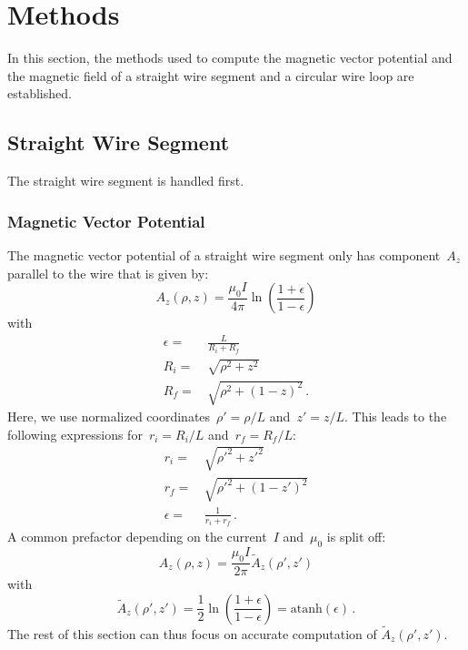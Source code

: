 \section{Methods}
\label{sec:methods}
In this section, the methods used to compute the magnetic vector potential and the magnetic field
of a straight wire segment and a circular wire loop are established.

\subsection{Straight Wire Segment}
The straight wire segment is handled first.

\subsubsection{Magnetic Vector Potential}
The magnetic vector potential of a straight wire segment
only has component~$A_z$ parallel to the wire that is given by:
\begin{equation}
  A_z(\rho, z) = \frac{\mu_0 I}{4 \pi} \ln \left( \frac{1+\epsilon}{1 - \epsilon} \right)
\end{equation}
with
\begin{align}
  \epsilon =&\, \frac{L}{R_i + R_f} \\
       R_i =&\, \sqrt{\rho^2 + z^2} \\
       R_f =&\, \sqrt{\rho^2 + (1-z)^2} \, .
\end{align}
Here, we use normalized coordinates~$\rho' = \rho/L$ and~$z' = z/L$.
This leads to the following expressions for~$r_i = R_i/L$ and~$r_f = R_f/L$:
\begin{align}
  r_i =&\, \sqrt{{\rho'}^2 +      {z'}^2 } \label{eqn:r_i_default} \\
  r_f =&\, \sqrt{{\rho'}^2 + (1 - {z'})^2} \label{eqn:r_f_default} \\
  \epsilon =&\, \frac{1}{r_i + r_f} \, .
\end{align}
A common prefactor depending on the current~$I$ and~$\mu_0$ is split off:
\begin{equation}
  A_z(\rho, z) = \frac{\mu_0 I}{2 \pi} \tilde{A}_z (\rho', z')
\end{equation}
with
\begin{equation}
  \tilde{A}_z (\rho', z')
  = \frac{1}{2} \ln \left( \frac{1+\epsilon}{1 - \epsilon} \right)
  = \textrm{atanh} (\epsilon) \, .
  \label{eqn:A_z_tilde}
\end{equation}
The rest of this section can thus focus on accurate computation of $\tilde{A}_z (\rho', z')$.


